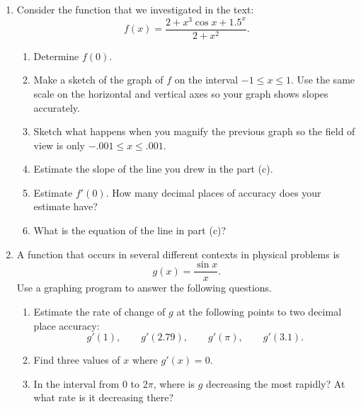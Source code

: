 \begin{enumerate}
  \begin{enumerate}
  \item $f(x) = \sin{x}$ at $x = 0$;


  \item $\varphi(t) = t + 2^{-t}$ at $t = 7$;


  \item $H(x) = x^{2/3}$ at $x = -5$.



\end{enumerate}
\item Consider the function that we investigated in the text:
	\[
f(x) = \dfrac{2 + x^3\cos{x} + 1.5^x}{2 + x^2}.
\]


  \begin{enumerate}
  \item Determine $f(0)$.

  \item Make a sketch of the graph of $f$ on the interval $-1 \leq x \leq
1$.  Use the same scale on the horizontal and vertical axes so your
graph shows slopes accurately.

  \item Sketch what happens when you magnify the previous graph so the
field of view is only $-.001 \leq x \leq .001$.

  \item Estimate the slope of the line you drew in the part (c).

  \item Estimate $f'(0)$.  How many decimal places of accuracy does your
estimate have?

  \item What is the equation of the line in part (c)?



\end{enumerate}
\item A function that occurs in several different contexts in physical
problems is
	\[
g(x) = \frac{\sin{x}}{x}.
\]
Use a graphing program to answer the following questions.

  \begin{enumerate}
  \item Estimate the rate of change of $g$ at the following points to two
decimal place accuracy:
	\[
g'(1), \qquad g'(2.79), \qquad g'(\pi), \qquad
		g'(3.1).
\]


  \item Find three values of $x$ where $g'(x) = 0$.

  \item In the interval from 0 to 2$\pi$, where is $g$ decreasing the
most rapidly?  At what rate is it decreasing there?


\end{enumerate}
\end{enumerate}
